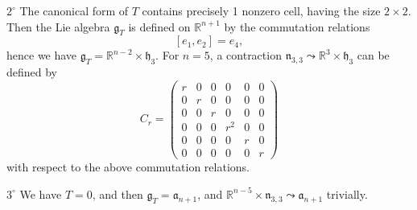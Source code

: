 \documentclass[
reqno]{amsart}
\begin{document}
\begin{itemize}
\smallbreak 

$2^\circ$ The canonical form of $T$ contains precisely 1 nonzero cell, 
 having the size $2\times 2$. 
Then the Lie algebra ${{\mathfrak g}}_T$ is defined on ${{\mathbb R}}^{n+1}$ by the commutation relations 
$$[e_1,e_2]=e_4,$$
hence we have ${{\mathfrak g}}_T={{\mathbb R}}^{n-2}\times {{\mathfrak h}}_3$. 
For $n=5$, a contraction ${{\mathfrak n}}_{3,3} {\leadsto} {{\mathbb R}}^3\times{{\mathfrak h}}_3$ 
can be defined by 
$$C_r=\begin{pmatrix}
r & 0 & 0 & 0 & 0 & 0 \\
0 & r & 0 & 0 & 0 & 0 \\
0 & 0 & r & 0 & 0 & 0 \\
0 & 0 & 0 & r^2 & 0 & 0 \\
0 & 0 & 0 & 0 & r & 0 \\
0 & 0 & 0 & 0 & 0 & r 
\end{pmatrix}$$
with respect to the above commutation relations. 

\smallbreak 

$3^\circ$ We have $T=0$, and then ${{\mathfrak g}}_T={{\mathfrak a}}_{n+1}$, and  
${{\mathbb R}}^{n-5}\times{{\mathfrak n}}_{3,3} {\leadsto}{{\mathfrak a}}_{n+1}$ trivially. 
\end{itemize}
\end{document}

